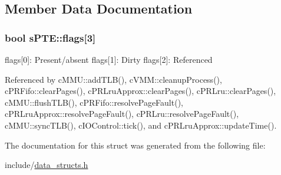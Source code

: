 \subsection{\-Member \-Data \-Documentation}
\hypertarget{structsPTE_a5088ab9c05c286c643ef97d04a3c9dad}{
\subsubsection[{flags}]{\setlength{\rightskip}{0pt plus 5cm}bool {\bf s\-P\-T\-E\-::flags}\mbox{[}3\mbox{]}}}\label{db/d4b/structsPTE_a5088ab9c05c286c643ef97d04a3c9dad}
flags\mbox{[}0\mbox{]}\-: \-Present/absent flags\mbox{[}1\mbox{]}\-: \-Dirty flags\mbox{[}2\mbox{]}\-: \-Referenced 

\-Referenced by c\-M\-M\-U\-::add\-T\-L\-B(), c\-V\-M\-M\-::cleanup\-Process(), c\-P\-R\-Fifo\-::clear\-Pages(), c\-P\-R\-Lru\-Approx\-::clear\-Pages(), c\-P\-R\-Lru\-::clear\-Pages(), c\-M\-M\-U\-::flush\-T\-L\-B(), c\-P\-R\-Fifo\-::resolve\-Page\-Fault(), c\-P\-R\-Lru\-Approx\-::resolve\-Page\-Fault(), c\-P\-R\-Lru\-::resolve\-Page\-Fault(), c\-M\-M\-U\-::sync\-T\-L\-B(), c\-I\-O\-Control\-::tick(), and c\-P\-R\-Lru\-Approx\-::update\-Time().



\-The documentation for this struct was generated from the following file\-:\begin{DoxyCompactItemize}
\item 
include/\hyperlink{data__structs_8h}{data\-\_\-structs.\-h}\end{DoxyCompactItemize}
